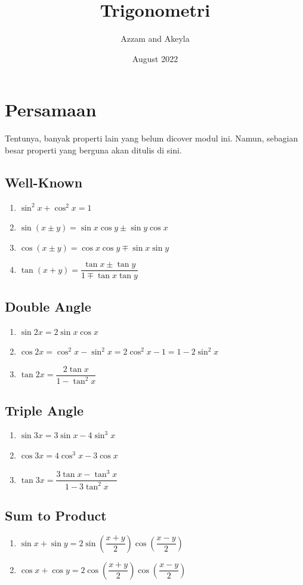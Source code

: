 \documentclass[11pt]{scrartcl}
\title{Trigonometri}
\author{Azzam and Akeyla}
\date{August 2022}
\begin{document}
\maketitle

\renewcommand*\contentsname{Daftar Isi}
\tableofcontents

\newpage

\section{Persamaan}
Tentunya, banyak properti lain yang belum dicover modul ini. Namun, sebagian besar properti yang berguna akan ditulis di sini.
\subsection{Well-Known}
\begin{enumerate}
    \item $\sin^2{x} + \cos^2{x} = 1$
    \item $\sin{(x \pm y)} = \sin{x}\cos{y} \pm \sin{y}\cos{x}$
    \item $\cos{(x \pm y)} = \cos{x}\cos{y} \mp \sin{x}\sin{y}$
    \item $\tan{(x + y)} = \dfrac{\tan{x} \pm \tan{y}}{1 \mp \tan{x}\tan{y}}$
\end{enumerate}
\subsection{Double Angle}
\begin{enumerate}
    \item $\sin{2x} = 2\sin{x}\cos{x}$
    \item $\cos{2x} = \cos^2{x} - \sin^2{x} = 2\cos^2{x} - 1 = 1 - 2\sin^2{x}$
    \item $\tan{2x} = \dfrac{2\tan{x}}{1 - \tan^2{x}}$
\end{enumerate}
\subsection{Triple Angle}
\begin{enumerate}
    \item $\sin{3x} = 3\sin{x} - 4\sin^3{x}$
    \item $\cos{3x} = 4\cos^3{x} - 3\cos{x}$
    \item $\tan{3x} = \dfrac{3\tan{x} - \tan^3{x}}{1 - 3\tan^2{x}}$
\end{enumerate}
\subsection{Sum to Product}
\begin{enumerate}
    \item $\sin{x} + \sin{y} = 2\sin{\left(\dfrac{x + y}{2}\right)}\cos{\left(\dfrac{x - y}{2}\right)}$
    \item $\cos{x} + \cos{y} = 2\cos{\left(\dfrac{x + y}{2}\right)}\cos{\left(\dfrac{x - y}{2}\right)}$
\end{enumerate}
\end{document}
